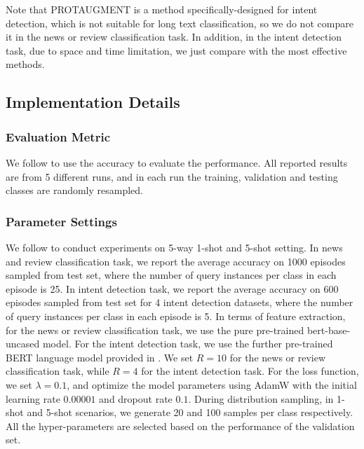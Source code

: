\documentclass[letterpaper]{article} %
\begin{document}
Note that PROTAUGMENT is a method specifically-designed for intent detection, which is not suitable for long text classification, so we do not compare it in the news or review classification task. In addition, in the intent detection task, due to space and time limitation, we just compare with the most effective methods.

\subsection{Implementation Details}

\subsubsection{Evaluation Metric}
We follow \cite{ContrastNet} to use the accuracy to evaluate the performance. All reported results are from 5 different runs, and in each run the training, validation and testing classes are randomly resampled.

\subsubsection{Parameter Settings}
We follow \cite{ContrastNet} to conduct experiments on 5-way 1-shot and 5-shot setting. In news and review classification task, we report the average accuracy on 1000 episodes sampled from test set, where the number of query instances per class in each episode is 25. In intent detection task, we report the average accuracy on 600 episodes sampled from test set for 4 intent detection datasets,  where the number of query instances per class in each episode is 5. In terms of feature extraction, for the news or review classification task, we use the pure pre-trained bert-base-uncased model. For the intent detection task, we use the further pre-trained BERT language model provided in \cite{ProtAugment}. We set $R = 10$ for the news or review classification task, while $R = 4$ for the intent detection task. For the loss function, we set $\lambda=0.1$, and optimize the model parameters using AdamW \cite{iclr/LoshchilovH19} with the initial learning rate $0.00001$ and dropout rate $0.1$. During distribution sampling, in 1-shot and 5-shot scenarios, we generate 20 and 100 samples per class respectively. All the hyper-parameters are selected based on the performance of the validation set.
\end{document}
